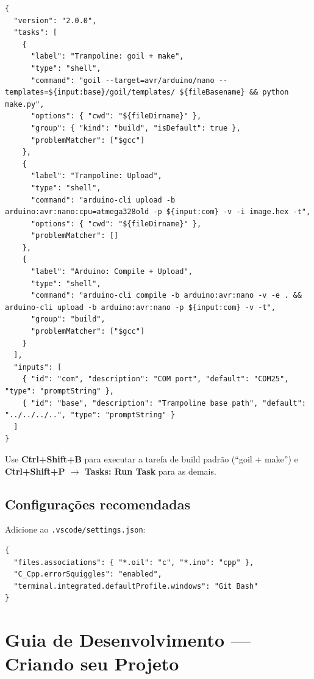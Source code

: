 \documentclass[12pt,a4paper]{article}
\begin{document}
\begin{lstlisting}[language={},caption={.vscode/tasks.json (resumido)}]
{
  "version": "2.0.0",
  "tasks": [
    {
      "label": "Trampoline: goil + make",
      "type": "shell",
      "command": "goil --target=avr/arduino/nano --templates=${input:base}/goil/templates/ ${fileBasename} && python make.py",
      "options": { "cwd": "${fileDirname}" },
      "group": { "kind": "build", "isDefault": true },
      "problemMatcher": ["$gcc"]
    },
    {
      "label": "Trampoline: Upload",
      "type": "shell",
      "command": "arduino-cli upload -b arduino:avr:nano:cpu=atmega328old -p ${input:com} -v -i image.hex -t",
      "options": { "cwd": "${fileDirname}" },
      "problemMatcher": []
    },
    {
      "label": "Arduino: Compile + Upload",
      "type": "shell",
      "command": "arduino-cli compile -b arduino:avr:nano -v -e . && arduino-cli upload -b arduino:avr:nano -p ${input:com} -v -t",
      "group": "build",
      "problemMatcher": ["$gcc"]
    }
  ],
  "inputs": [
    { "id": "com", "description": "COM port", "default": "COM25", "type": "promptString" },
    { "id": "base", "description": "Trampoline base path", "default": "../../../..", "type": "promptString" }
  ]
}
\end{lstlisting}

\begin{dicabox}
Use \textbf{Ctrl+Shift+B} para executar a tarefa de build padrão (``goil + make'') e \textbf{Ctrl+Shift+P $\rightarrow$ Tasks: Run Task} para as demais.
\end{dicabox}

\subsection{Configurações recomendadas}

Adicione ao \texttt{.vscode/settings.json}:

\begin{lstlisting}[language={}]
{
  "files.associations": { "*.oil": "c", "*.ino": "cpp" },
  "C_Cpp.errorSquiggles": "enabled",
  "terminal.integrated.defaultProfile.windows": "Git Bash"
}
\end{lstlisting}

\section{Guia de Desenvolvimento --- Criando seu Projeto}
\end{document}
